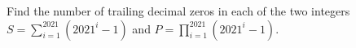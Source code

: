 Find the number of trailing decimal zeros in each of the two integers $S=\sum_{i=1}^{2021}(2021^i-1)$ and $P=\prod_{i=1}^{2021}(2021^i-1)$.
